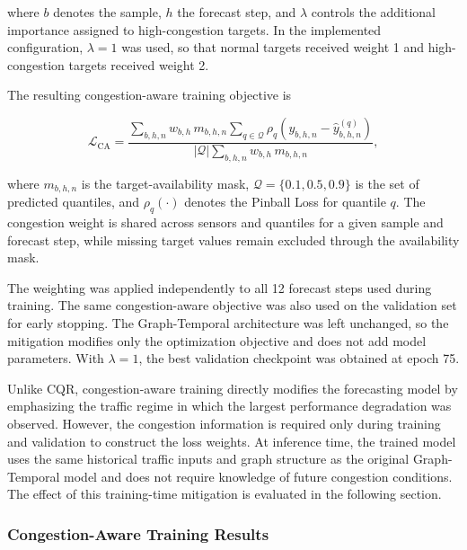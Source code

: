 where $b$ denotes the sample, $h$ the forecast step, and $\lambda$ controls
the additional importance assigned to high-congestion targets. In the
implemented configuration, $\lambda=1$ was used, so that normal targets
received weight 1 and high-congestion targets received weight 2.

The resulting congestion-aware training objective is

\begin{equation}
    \mathcal{L}_{\mathrm{CA}}
    =
    \frac{
        \displaystyle
        \sum_{b,h,n}
        w_{b,h}\,
        m_{b,h,n}
        \sum_{q \in \mathcal{Q}}
        \rho_q
        \left(
            y_{b,h,n}
            -
            \hat{y}^{(q)}_{b,h,n}
        \right)
    }{
        \displaystyle
        |\mathcal{Q}|
        \sum_{b,h,n}
        w_{b,h}\,
        m_{b,h,n}
    },
    \label{eq:congestion_aware_loss}
\end{equation}

where $m_{b,h,n}$ is the target-availability mask,
$\mathcal{Q}=\{0.1,0.5,0.9\}$ is the set of predicted quantiles, and
$\rho_q(\cdot)$ denotes the Pinball Loss for quantile $q$. The congestion
weight is shared across sensors and quantiles for a given sample and forecast
step, while missing target values remain excluded through the availability
mask.

The weighting was applied independently to all 12 forecast steps used during
training. The same congestion-aware objective was also used on the validation
set for early stopping. The Graph-Temporal architecture was left unchanged,
so the mitigation modifies only the optimization objective and does not add
model parameters. With $\lambda=1$, the best validation checkpoint was
obtained at epoch 75.

Unlike CQR, congestion-aware training directly modifies the forecasting model
by emphasizing the traffic regime in which the largest performance
degradation was observed. However, the congestion information is required
only during training and validation to construct the loss weights. At
inference time, the trained model uses the same historical traffic inputs and
graph structure as the original Graph-Temporal model and does not require
knowledge of future congestion conditions. The effect of this training-time
mitigation is evaluated in the following section.


\subsubsection{Congestion-Aware Training Results}

